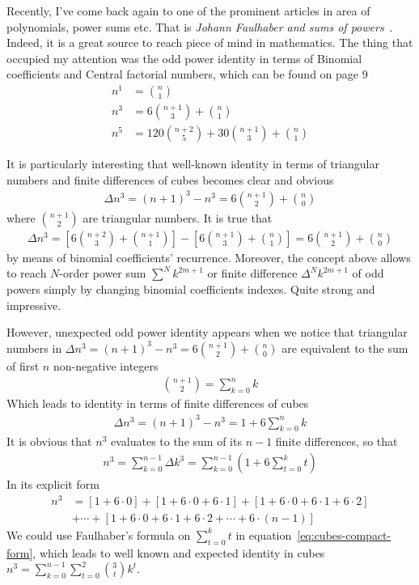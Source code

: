 Recently, I've come back again to one of the prominent articles in area of polynomials, power sums etc.
That is \textit{Johann Faulhaber and sums of powers}~\cite{knuth1993johann}.
Indeed, it is a great source to reach piece of mind in mathematics.
The thing that occupied my attention was the odd power identity in terms of Binomial coefficients and
Central factorial numbers, which can be found on page 9
\begin{align*}
    n^1 &= \binom{n}{1} \\
    n^3 &= 6 \binom{n+1}{3} + \binom{n}{1} \\
    n^5 &= 120 \binom{n+2}{5} + 30 \binom{n+1}{3} + \binom{n}{1}
\end{align*}

It is particularly interesting that well-known identity in terms of triangular numbers
and finite differences of cubes becomes clear and obvious
\begin{align*}
    \Delta n^3 = (n+1)^3 - n^3
    =  6 \binom{n+1}{2} + \binom{n}{0}
\end{align*}
where $\binom{n+1}{2}$ are triangular numbers.
It is true that
\begin{align*}
    \Delta n^3 = \left[ 6 \binom{n+2}{3} + \binom{n+1}{1} \right] - \left[ 6 \binom{n+1}{3} + \binom{n}{1} \right] = 6 \binom{n+1}{2} + \binom{n}{0}
\end{align*}
by means of binomial coefficients' recurrence.
Moreover, the concept above allows to reach $N$-order power sum $\sum^N k^{2m+1}$
or finite difference $\Delta^N k^{2m+1}$ of odd powers simply by changing
binomial coefficients indexes.
Quite strong and impressive.

However, unexpected odd power identity appears when we notice that triangular
numbers in $\Delta n^3 = (n+1)^3 - n^3 =  6 \binom{n+1}{2} + \binom{n}{0}$
are equivalent to the sum of first $n$ non-negative integers
\begin{align*}
    \binom{n+1}{2} = \sum_{k=0}^{n} k
\end{align*}
Which leads to identity in terms of finite differences of cubes
\begin{align*}
    \Delta n^3 = (n+1)^3 - n^3 = 1 + 6 \sum_{k=0}^{n} k
\end{align*}
It is obvious that $n^3$ evaluates to the sum of its $n-1$ finite differences, so that
\begin{align}
    \label{eq:cubes-compact-form}
    n^3 = \sum_{k=0}^{n-1} \Delta k^3 = \sum_{k=0}^{n-1} \left( 1 + 6 \sum_{t=0}^{k} t \right)
\end{align}
In its explicit form
\begin{align}
    \label{eq:cubes-explicit-form}
    n^3 &= [1+6\cdot0]+[1+6\cdot0+6\cdot1]+[1+6\cdot0+6\cdot1+6\cdot2] \\
    &+ \cdots + [1+6\cdot0+6\cdot1+6\cdot2+\cdots+6\cdot(n-1)] \nonumber
\end{align}
We could use Faulhaber's formula on $\sum_{t=0}^{k} t$ in equation~\eqref{eq:cubes-compact-form},
which leads to well known and expected identity in cubes $n^3 = \sum_{k=0}^{n-1} \sum_{t=0}^{2} \binom{3}{t} k^t$.

